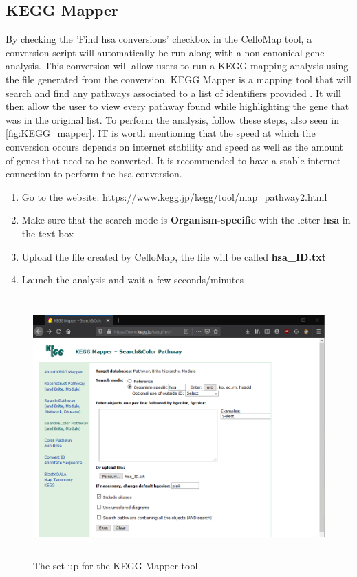 \documentclass[11pt]{article}
\begin{document}
\subsection{KEGG Mapper \label{KEGG Map}}
By checking the 'Find \acrshort{hsa} conversions' checkbox in the CelloMap tool, a conversion script will automatically be run along with a non-canonical gene analysis. This conversion will allow users to run a \acrshort{KEGG} mapping analysis using the file generated from the conversion.
\acrshort{KEGG} Mapper is a mapping tool that will search and find any pathways associated to a list of identifiers provided \cite{kanehisa2019kegg}. It will then allow the user to view every pathway found while highlighting the gene that was in the original list.
To perform the analysis, follow these steps, also seen in \autoref{fig:KEGG_mapper}.
IT is worth mentioning that the speed at which the conversion occurs depends on internet stability and speed as well as the amount of genes that need to be converted. It is recommended to have a stable internet connection to perform the \acrshort{hsa} conversion.
\begin{enumerate}
\item Go to the website: \url{https://www.kegg.jp/kegg/tool/map_pathway2.html}
\item Make sure that the search mode is \textbf{Organism-specific} with the letter \textbf{\acrshort{hsa}} in the text box
\item Upload the file created by CelloMap, the file will be called \textbf{\acrshort{hsa}\_ID.txt} 
\item Launch the analysis and wait a few seconds/minutes
\end{enumerate}

\begin{figure}[h!]
\centering
\includegraphics[width=15cm,height=10cm,keepaspectratio]{KEGG_Mapper.png}
\caption{The set-up for the \acrshort{KEGG} Mapper tool}
\label{fig:KEGG_mapper}
\end{figure}
\end{document}
